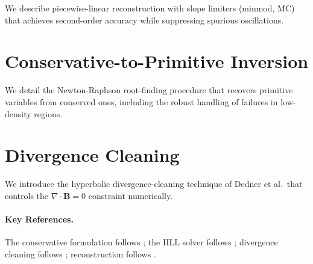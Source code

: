 We describe piecewise-linear reconstruction with slope limiters (minmod, MC)
that achieves second-order accuracy while suppressing spurious oscillations.

\section{Conservative-to-Primitive Inversion}
\label{sec:mhd-con2prim}

We detail the Newton-Raphson root-finding procedure that recovers primitive
variables from conserved ones, including the robust handling of failures in
low-density regions.

\section{Divergence Cleaning}
\label{sec:mhd-divclean}

We introduce the hyperbolic divergence-cleaning technique of Dedner et al.\
that controls the $\nabla \cdot \mathbf{B} = 0$ constraint numerically.

\paragraph{Key References.}
The conservative formulation follows \cite{Font2008}; the HLL solver follows
\cite{Harten1983}; divergence cleaning follows \cite{Dedner2002};
reconstruction follows \cite{vanLeer1979,Toro2009}.
